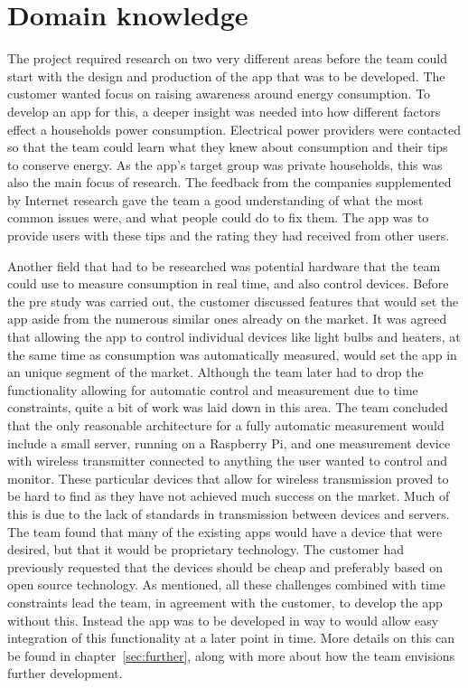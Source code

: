\section{Domain knowledge}
The project required research on two very different areas before the team could start with the design and production of the app that was to be developed. The customer wanted focus on raising awareness around energy consumption. To develop an app for this, a deeper insight was needed into how different factors effect a households  power consumption. Electrical power providers were contacted so that the team could learn what they knew about consumption and their tips to conserve energy. As the app's target group was private households, this was also the main focus of research. The feedback from the companies supplemented by Internet research gave the team a good understanding of what the most common issues were, and what people could do to fix them. The app was to provide users with these tips and the rating they had received from other users. 

Another field that had to be researched was potential hardware that the team could use to measure consumption in real time, and also control devices. Before the pre study was carried out, the customer discussed features that would set the app aside from the numerous similar ones already on the market. It was agreed that allowing the app to control individual devices like light bulbs and heaters, at the same time as consumption was automatically measured, would set the app in an unique segment of the market. Although the team later had to drop the functionality allowing for automatic control and measurement due to time constraints, quite a bit of work was laid down in this area. The team concluded that the only reasonable architecture for a fully automatic measurement would include a small server, running on a Raspberry Pi, and one measurement device with wireless transmitter connected to anything the user wanted to control and monitor. These particular devices that allow for wireless transmission proved to be hard to find as they have not achieved much success on the market. Much of this is due to the lack of standards in transmission between devices and servers. The team found that many of the existing apps would have a device that were desired, but that it would be proprietary technology. The customer had previously requested that the devices should be cheap and preferably based on open source technology. As mentioned, all these challenges combined with time constraints lead the team, in agreement with the customer, to develop the app without  this. Instead the app was to be developed in way to would allow easy integration of this functionality at a later point in time. More details on this can be found in chapter~\ref{sec:further}, along with more about how the team envisions further development. 
